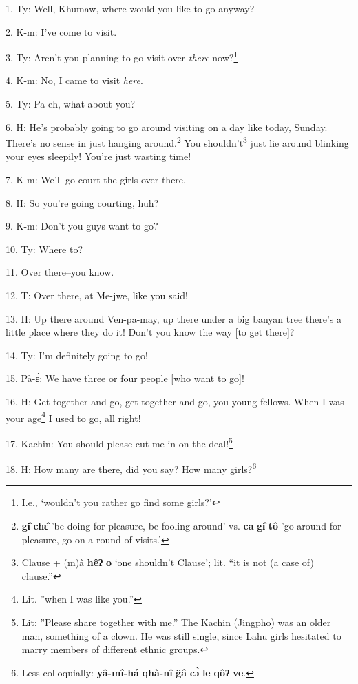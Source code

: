 \setcounter{footnote}{0}

1. Ty: Well, Khumaw, where would you like to go anyway?

2. K-m: I've come to visit.

3. Ty: Aren't you planning to go visit over \textit{there} now?\footnote{I.e., `wouldn't you rather go find some girls?'}

4. K-m: No, I came to visit \textit{here}.

5. Ty: Pa-eh, what about you?

6. H: He's probably going to go around visiting on a day like today, Sunday. There's
no sense in just hanging around.\footnote{\textbf{gɨ̂} \textbf{chɛ̂} 'be doing for pleasure, be fooling around' vs. \textbf{ca} \textbf{gɨ̂} \textbf{tô} 'go around for pleasure, go on a round of visits.'} You shouldn't\footnote{Clause + (m)â \textbf{hêʔ} \textbf{o} `one shouldn't Clause'; lit. ``it is not (a case of) clause.''} just lie around blinking
your eyes sleepily! You're just wasting time!

7. K-m: We'll go court the girls over there.

8. H: So you're going courting, huh?

9. K-m: Don't you guys want to go?

10. Ty: Where to?

11. Over there--you know.

12. T: Over there, at Me-jwe, like you said!

13. H: Up there around Ven-pa-may, up there under a big banyan tree there's a little
place where they do it! Don't you know the way [to get there]?

14. Ty: I'm definitely going to go!

15. Pà-ɛ́: We have three or four people [who want to go]!

16. H: Get together and go, get together and go, you young fellows. When I was your
age\footnote{Lit. ''when I was like you.''} I used to go, all right!

17. Kachin: You should please cut me in on the deal!\footnote{Lit: ''Please share together with me.'' The Kachin (Jingpho) was an older man, something of a clown. He was still single, since Lahu girls hesitated to marry members of different ethnic groups.}


18. H: How many are there, did you say? How many girls?\footnote{Less colloquially: \textbf{yâ-mî-há} \textbf{qhà-nî} \textbf{g̈â} \textbf{cɔ̀} \textbf{le} \textbf{qôʔ} \textbf{ve}.}

